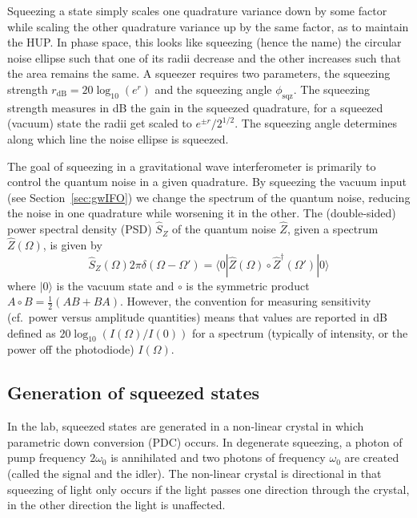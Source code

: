 \documentclass[aps,pra,superscriptaddress,reprint,nofootinbib]{revtex4-1}
\begin{document}
Squeezing a state simply scales one quadrature variance down by some factor while scaling the other quadrature variance up by the same factor, as to maintain the HUP. In phase space, this looks like squeezing (hence the name) the circular noise ellipse such that one of its radii decrease and the other increases such that the area remains the same. A squeezer requires two parameters, the squeezing strength $r_{\mathrm{dB}} = 20 \log_{10}(e^r)$ and the squeezing angle $\phi_{\mathrm{sqz}}$. The squeezing strength measures in dB the gain in the squeezed quadrature, for a squeezed (vacuum) state the radii get scaled to $e^{\pm r}/2^{1/2}$. The squeezing angle determines along which line the noise ellipse is squeezed.


The goal of squeezing in a gravitational wave interferometer is primarily to control the quantum noise in a given quadrature. By squeezing the vacuum input (see Section~\ref{sec:gwIFO}) we change the spectrum of the quantum noise, reducing the noise in one quadrature while worsening it in the other. The (double-sided) power spectral density (PSD) $\hat{S}_Z$ of the quantum noise $\hat{Z}$, given a spectrum $\hat{Z}(\Omega)$, is given by $$\hat{S}_Z(\Omega) 2 \pi \delta(\Omega - \Omega') = \langle0| \hat{Z}(\Omega) \circ \hat{Z}^\dagger(\Omega') |0\rangle$$ where $|0\rangle$ is the vacuum state and $\circ$ is the symmetric product $A \circ B = \frac{1}{2}(A B + B A)$. However, the convention for measuring sensitivity (cf.\ power versus amplitude quantities) means that values are reported in dB defined as $20 \log_{10}(I(\Omega)/I(0))$ for a spectrum (typically of intensity, or the power off the photodiode) $I(\Omega)$.


\subsection{Generation of squeezed states}

In the lab, squeezed states are generated in a non-linear crystal in which parametric down conversion (PDC) occurs. In degenerate squeezing, a photon of pump frequency $2\omega_0$ is annihilated and two photons of frequency $\omega_0$ are created (called the signal and the idler). The non-linear crystal is directional in that squeezing of light only occurs if the light passes one direction through the crystal, in the other direction the light is unaffected.
\end{document}
